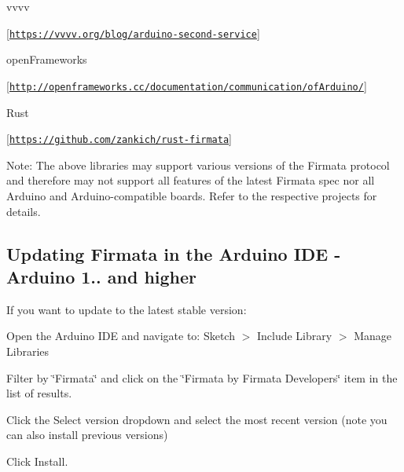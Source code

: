 \begin{DoxyItemize}
\begin{DoxyItemize}
\end{DoxyItemize}
\item vvvv
\begin{DoxyItemize}
\item \mbox{[}\href{https://vvvv.org/blog/arduino-second-service}{\tt https\+://vvvv.\+org/blog/arduino-\/second-\/service}\mbox{]}
\end{DoxyItemize}
\item open\+Frameworks
\begin{DoxyItemize}
\item \mbox{[}\href{http://openframeworks.cc/documentation/communication/ofArduino/}{\tt http\+://openframeworks.\+cc/documentation/communication/of\+Arduino/}\mbox{]}
\end{DoxyItemize}
\item Rust
\begin{DoxyItemize}
\item \mbox{[}\href{https://github.com/zankich/rust-firmata}{\tt https\+://github.\+com/zankich/rust-\/firmata}\mbox{]}
\end{DoxyItemize}
\end{DoxyItemize}

Note\+: The above libraries may support various versions of the Firmata protocol and therefore may not support all features of the latest Firmata spec nor all Arduino and Arduino-\/compatible boards. Refer to the respective projects for details.

\subsection*{Updating Firmata in the Arduino I\+DE -\/ Arduino 1.. and higher}

If you want to update to the latest stable version\+:


\begin{DoxyEnumerate}
\item Open the Arduino I\+DE and navigate to\+: {\ttfamily Sketch $>$ Include Library $>$ Manage Libraries}
\item Filter by \char`\"{}\+Firmata\char`\"{} and click on the \char`\"{}\+Firmata by Firmata Developers\char`\"{} item in the list of results.
\item Click the {\ttfamily Select version} dropdown and select the most recent version (note you can also install previous versions)
\item Click {\ttfamily Install}.
\end{DoxyEnumerate}

